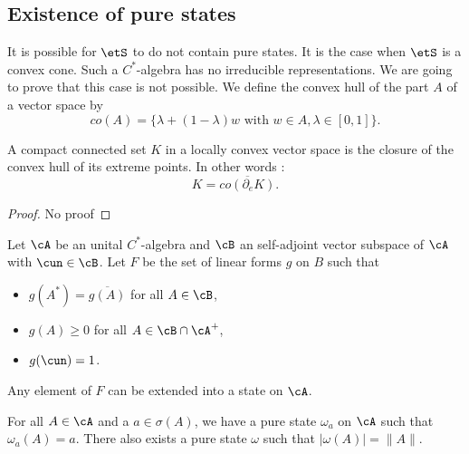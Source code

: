 \subsection{Existence of pure states}

It is possible for $\etS$ to do not contain pure states. It is the case when $\etS$ is a convex cone. Such a $C^*$-algebra  has no irreducible representations. We are going to prove that this case is not possible. We define the convex hull of the part $A$ of a vector space by
\[ 
  co(A)=\{ \lambda+(1-\lambda)w\text{ with }w\in A,\lambda\in[0,1] \}.
\]



\begin{theorem}
 A compact connected set $K$ in a locally convex vector space is the closure of the convex hull of its extreme points. In other words :
    \[ 
  K=\overline{ co(\partial_eK) }.
\]

\end{theorem}
\begin{proof}
No proof
\end{proof}


\begin{lemma}

 Let $\cA$ be an unital $C^*$-algebra  and $\cB$ an self-adjoint vector subspace of $\cA$ with $\cun\in\cB$. Let $F$ be the set of linear forms $g$ on $B$ such that


\begin{itemize}
\item  $g(A^*) = \overline{g(A)}$ for all $A\in\cB$,
 \item $g(A) \geq 0$ for all $A\in \cB\cap \cA^+$,
\item $g(\cun)=1$.
\end{itemize}
 Any element of $F$ can be extended into a state on $\cA$.
\label{lem_DixcBprol}
 \end{lemma}


\begin{theorem}  
For all $A\in\cA$ and a $a\in\sigma(A)$, we have a pure state $\omega_a$ on $\cA$ such that $\omega_a(A)=a$. There also exists a pure state $\omega$ such that $| \omega(A) |=\| A \|$.
\label{tho_existsetat}
\end{theorem}


